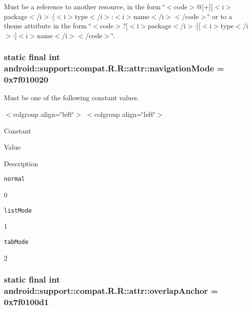 Must be a reference to another resource, in the form \char`\"{}$<$code$>$@\mbox{[}+\mbox{]}\mbox{[}$<$i$>$package$<$/i$>$:\mbox{]}$<$i$>$type$<$/i$>$:$<$i$>$name$<$/i$>$$<$/code$>$\char`\"{} or to a theme attribute in the form \char`\"{}$<$code$>$?\mbox{[}$<$i$>$package$<$/i$>$:\mbox{]}\mbox{[}$<$i$>$type$<$/i$>$:\mbox{]}$<$i$>$name$<$/i$>$$<$/code$>$\char`\"{}. \hypertarget{classandroid_1_1support_1_1compat_1_1_r_1_1attr_b9cab9ecf9145958c407eae6c939d4b9}{
\subsubsection[{navigationMode}]{\setlength{\rightskip}{0pt plus 5cm}static final int android::support::compat.R.R::attr::navigationMode = 0x7f010020}}
\label{classandroid_1_1support_1_1compat_1_1_r_1_1attr_b9cab9ecf9145958c407eae6c939d4b9}


Must be one of the following constant values. \begin{TabularC}{0}
\hline
\end{TabularC}
$<$colgroup align=\char`\"{}left\char`\"{}$>$ $<$colgroup align=\char`\"{}left\char`\"{}$>$ 

Constant

Value

Description 

{\tt normal}

0

{\tt listMode}

1

{\tt tabMode}

2\hypertarget{classandroid_1_1support_1_1compat_1_1_r_1_1attr_dc37cf76fc811983dd6902ca7d49f103}{
\subsubsection[{overlapAnchor}]{\setlength{\rightskip}{0pt plus 5cm}static final int android::support::compat.R.R::attr::overlapAnchor = 0x7f0100d1}}
\label{classandroid_1_1support_1_1compat_1_1_r_1_1attr_dc37cf76fc811983dd6902ca7d49f103}


